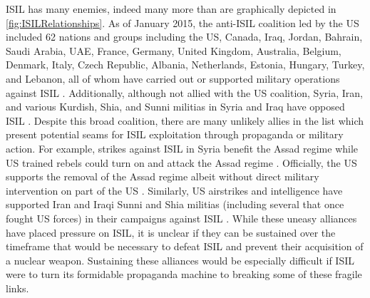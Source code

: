 \documentclass{report}
\begin{document}
ISIL has many enemies, indeed many more than are graphically depicted in \autoref{fig:ISILRelationships}.  As of January 2015, the anti-ISIL coalition led by the US included 62 nations and groups including the US, Canada, Iraq, Jordan, Bahrain, Saudi Arabia, UAE, France, Germany, United Kingdom, Australia, Belgium, Denmark, Italy, Czech Republic, Albania, Netherlands, Estonia, Hungary, Turkey, and Lebanon, all of whom have carried out or supported military operations against ISIL \cite{Wordsworth2015}.  Additionally, although not allied with the US coalition, Syria, Iran, and various Kurdish, Shia, and Sunni militias in Syria and Iraq have opposed ISIL \cite{Mooney2014}.  Despite this broad coalition, there are many unlikely allies in the list which present potential seams for ISIL exploitation  through propaganda or military action.  For example, strikes against ISIL in Syria benefit the Assad regime while US trained rebels could turn on and attack the Assad regime \cite{Shinkman2015}.  Officially, the US supports the removal of the Assad regime albeit without direct military intervention on part of the US \cite{Shinkman2015}.  Similarly, US airstrikes and intelligence have supported Iran and Iraqi Sunni and Shia militias (including several that once fought US forces) in their campaigns against ISIL \cite{Chulov2014}.  While these uneasy alliances have placed pressure on ISIL, it is unclear if they can be sustained over the timeframe that would be necessary to defeat ISIL and prevent their acquisition of a nuclear weapon. Sustaining these alliances would be especially difficult if ISIL were to turn its formidable propaganda machine to breaking some of these fragile links.
\end{document}
